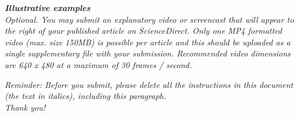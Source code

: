 \documentclass[11pt, letterpaper]{article}
\begin{document}
\noindent
\textit{\textbf{Illustrative examples}}\\
\textit{Optional. You may submit an explanatory video or screencast that will appear to the right of your published article on ScienceDirect. Only one MP4 formatted video (max. size 150MB) is possible per article and this should be uploaded as a single supplementary file with your submission. Recommended video dimensions are 640 x 480 at a maximum of 30 frames / second. %
}

\vskip 1.5cm
\begin{center}
{\huge \it Reminder: Before you submit, please delete all 
the instructions in this document (the text in italics), including this paragraph.\\
Thank you!}
\end{center}
\end{document}
